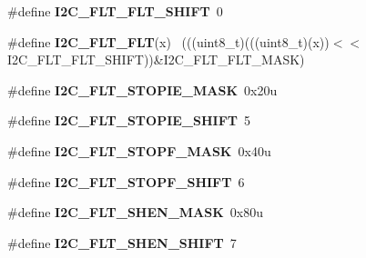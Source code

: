 \begin{DoxyCompactItemize}
\item 
\hypertarget{group___i2_c___register___masks_ga87c3021777b04e02f3c0481cdbde30e5}{}\#define {\bfseries I2\+C\+\_\+\+F\+L\+T\+\_\+\+F\+L\+T\+\_\+\+S\+H\+I\+F\+T}~0\label{group___i2_c___register___masks_ga87c3021777b04e02f3c0481cdbde30e5}

\item 
\hypertarget{group___i2_c___register___masks_ga631031ca92f64aab49d6b19e23d6bb4b}{}\#define {\bfseries I2\+C\+\_\+\+F\+L\+T\+\_\+\+F\+L\+T}(x)                                                  ~(((uint8\+\_\+t)(((uint8\+\_\+t)(x))$<$$<$I2\+C\+\_\+\+F\+L\+T\+\_\+\+F\+L\+T\+\_\+\+S\+H\+I\+F\+T))\&I2\+C\+\_\+\+F\+L\+T\+\_\+\+F\+L\+T\+\_\+\+M\+A\+S\+K)\label{group___i2_c___register___masks_ga631031ca92f64aab49d6b19e23d6bb4b}

\item 
\hypertarget{group___i2_c___register___masks_gaa27b045912504147aa01e74d861bcc9b}{}\#define {\bfseries I2\+C\+\_\+\+F\+L\+T\+\_\+\+S\+T\+O\+P\+I\+E\+\_\+\+M\+A\+S\+K}~0x20u\label{group___i2_c___register___masks_gaa27b045912504147aa01e74d861bcc9b}

\item 
\hypertarget{group___i2_c___register___masks_ga74a7ab061627ad3188d0076c7e0209d2}{}\#define {\bfseries I2\+C\+\_\+\+F\+L\+T\+\_\+\+S\+T\+O\+P\+I\+E\+\_\+\+S\+H\+I\+F\+T}~5\label{group___i2_c___register___masks_ga74a7ab061627ad3188d0076c7e0209d2}

\item 
\hypertarget{group___i2_c___register___masks_ga49bb44800a0defc2dd1efb27263f7c52}{}\#define {\bfseries I2\+C\+\_\+\+F\+L\+T\+\_\+\+S\+T\+O\+P\+F\+\_\+\+M\+A\+S\+K}~0x40u\label{group___i2_c___register___masks_ga49bb44800a0defc2dd1efb27263f7c52}

\item 
\hypertarget{group___i2_c___register___masks_gae69dbb7d8bd1dff50e5c30846d3285bb}{}\#define {\bfseries I2\+C\+\_\+\+F\+L\+T\+\_\+\+S\+T\+O\+P\+F\+\_\+\+S\+H\+I\+F\+T}~6\label{group___i2_c___register___masks_gae69dbb7d8bd1dff50e5c30846d3285bb}

\item 
\hypertarget{group___i2_c___register___masks_gac404fda03fc23c08a56018d6ab2fc977}{}\#define {\bfseries I2\+C\+\_\+\+F\+L\+T\+\_\+\+S\+H\+E\+N\+\_\+\+M\+A\+S\+K}~0x80u\label{group___i2_c___register___masks_gac404fda03fc23c08a56018d6ab2fc977}

\item 
\hypertarget{group___i2_c___register___masks_ga5d6c7b67f99e1f592d199bb77f7d5605}{}\#define {\bfseries I2\+C\+\_\+\+F\+L\+T\+\_\+\+S\+H\+E\+N\+\_\+\+S\+H\+I\+F\+T}~7\label{group___i2_c___register___masks_ga5d6c7b67f99e1f592d199bb77f7d5605}


\end{DoxyCompactItemize}
